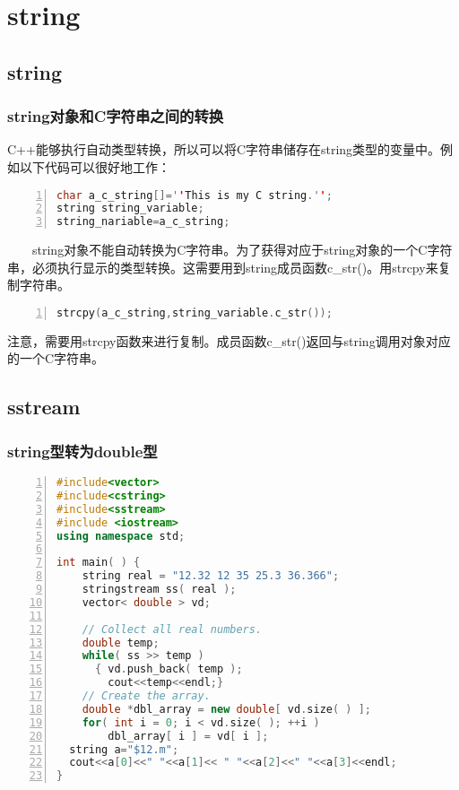 \documentclass[11pt,a4paper,titlepage]{article}
\begin{document}
\section{\kai string}
\subsection{\kai string}
\subsubsection{\kai string对象和C字符串之间的转换}
\ming C++能够执行自动类型转换，所以可以将C字符串储存在string类型的变量中。例如以下代码可以很好地工作：
\begin{lstlisting}[language=C++, numbers=left]
char a_c_string[]=''This is my C string.'';
string string_variable;
string_nariable=a_c_string;
\end{lstlisting}
{~~~~}string对象不能自动转换为C字符串。为了获得对应于string对象的一个C字符串，必须执行显示的类型转换。这需要用到string成员函数c\_str()。用strcpy来复制字符串。
\begin{lstlisting}[language=C++, numbers=left]
strcpy(a_c_string,string_variable.c_str());
\end{lstlisting}
注意，需要用strcpy函数来进行复制。成员函数c\_str()返回与string调用对象对应的一个C字符串。

\subsection{\kai sstream}
\subsubsection{\kai string型转为double型}
\begin{lstlisting}[language=C++, numbers=left]
#include<vector>
#include<cstring>
#include<sstream>
#include <iostream>
using namespace std;

int main( ) {
    string real = "12.32 12 35 25.3 36.366";
    stringstream ss( real );
    vector< double > vd;

    // Collect all real numbers.
    double temp;
    while( ss >> temp )
      { vd.push_back( temp );
    	cout<<temp<<endl;}
    // Create the array.
    double *dbl_array = new double[ vd.size( ) ];
    for( int i = 0; i < vd.size( ); ++i )
        dbl_array[ i ] = vd[ i ];
  string a="$12.m";
  cout<<a[0]<<" "<<a[1]<< " "<<a[2]<<" "<<a[3]<<endl;
}
\end{lstlisting}
\end{document}
